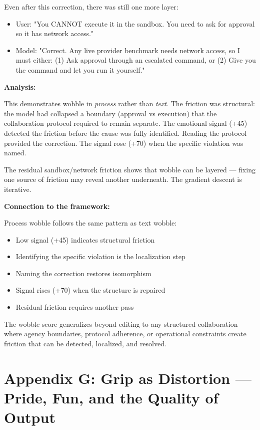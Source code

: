 Even after this correction, there was still one more layer:

\begin{itemize}
\item User: "You CANNOT execute it in the sandbox. You need to ask for approval so it has network access."
\item Model: "Correct. Any live provider benchmark needs network access, so I must either: (1) Ask approval through an escalated command, or (2) Give you the command and let you run it yourself."
\end{itemize}

\textbf{Analysis:}

This demonstrates wobble in \emph{process} rather than \emph{text}. The friction was structural: the model had collapsed a boundary (approval vs execution) that the collaboration protocol required to remain separate. The emotional signal (+45) detected the friction before the cause was fully identified. Reading the protocol provided the correction. The signal rose (+70) when the specific violation was named.

The residual sandbox/network friction shows that wobble can be layered --- fixing one source of friction may reveal another underneath. The gradient descent is iterative.

\textbf{Connection to the framework:}

Process wobble follows the same pattern as text wobble:
\begin{itemize}
\item Low signal (+45) indicates structural friction
\item Identifying the specific violation is the localization step
\item Naming the correction restores isomorphism
\item Signal rises (+70) when the structure is repaired
\item Residual friction requires another pass
\end{itemize}

The wobble score generalizes beyond editing to any structured collaboration where agency boundaries, protocol adherence, or operational constraints create friction that can be detected, localized, and resolved.

\section*{Appendix G: Grip as Distortion --- Pride, Fun, and the Quality of Output}


